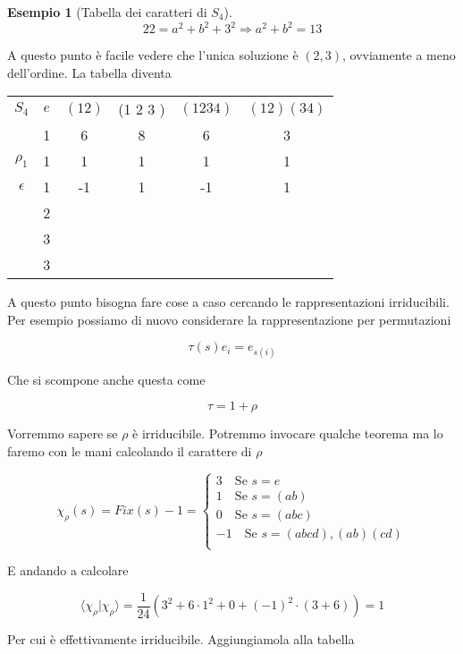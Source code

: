\documentclass[11pt]{article}
\theoremstyle{plain}
\theoremstyle{definition}
\newtheorem{exmp}{Esempio}[section]
\theoremstyle{remark}
\begin{document}
\begin{exmp}[Tabella dei caratteri di $S_4$]
\[ 22 = a^2 + b^2 + 3^2 \Rightarrow a^2 + b^2 = 13 \]

A questo punto è facile vedere che l'unica soluzione è $(2,3)$, ovviamente a meno dell'ordine. La tabella diventa


\begin{table}[!ht]
\centering
\begin{tabular}{|c|c|c|c|c|c|}
\hline
$S_4$  & $e$ & $(1 2)$ & (1 2 3 ) & $(1 2 3 4)$ & $(1 2)(3 4)$ \\
 & 1 & 6 & 8 & 6 & 3 \\
\hline
 $\rho_1$ & 1 & 1  & 1 & 1 & 1\\
\hline
$\epsilon$ & 1  & -1 & 1 & -1 & 1 \\
\hline
& 2&  & & & \\
\hline
& 3&  & & & \\
\hline
& 3&  & & & \\
\hline
\end{tabular}
\end{table}
 


A questo punto bisogna fare cose a caso cercando le rappresentazioni irriducibili. Per esempio possiamo di nuovo considerare la rappresentazione per permutazioni



\[ \tau(s) e_i = e_{s(i)}\]


Che si scompone anche questa come

\[ \tau = 1 + \rho\]

Vorremmo sapere se $\rho$ è irriducibile. Potremmo invocare qualche teorema ma lo faremo con le mani calcolando il carattere di $\rho$


\[ \chi_\rho(s) = Fix(s) - 1 = 
\begin{cases}
3 \quad \text{Se } s = e \\
1 \quad \text{Se } s = (a b) \\
0 \quad \text{Se } s = (a b c) \\
-1 \quad \text{Se } s = (a b c d ), (a b) (c d)\\
\end{cases}
\]

E andando a calcolare

\[\langle\chi_\rho |\chi_\rho\rangle = \dfrac{1}{24}\left(3^2  + 6 \cdot 1^2  + 0 + (-1)^2 \cdot (3 +6 )\right) = 1\]
 

Per cui è effettivamente irriducibile.  Aggiungiamola alla tabella




\end{exmp}
\end{document}
